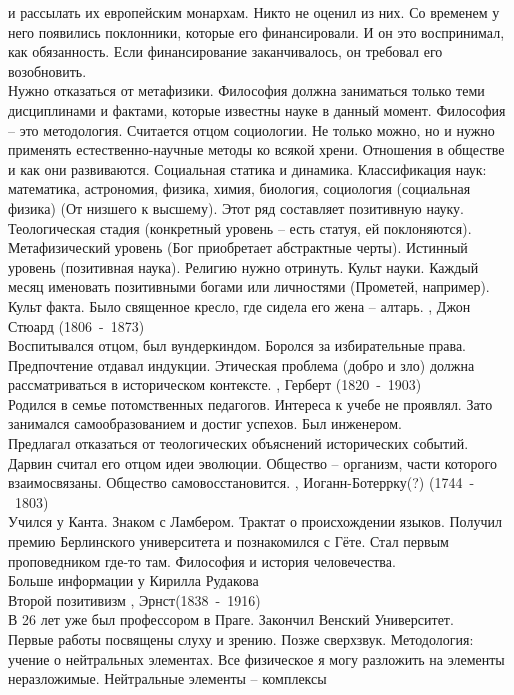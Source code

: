 \documentclass[a4paper,12pt]{report} %
\begin{document}
\begin{itemize}
и рассылать их европейским монархам. Никто не оценил из них. Со
временем у него появились поклонники, которые его финансировали. И он
это воспринимал, как обязанность. Если финансирование заканчивалось,
он требовал его возобновить.\\
Нужно отказаться от метафизики. Философия должна заниматься только
теми дисциплинами и фактами, которые известны науке в данный
момент. Философия -- это методология. Считается отцом социологии. Не
только можно, но и нужно применять естественно-научные методы ко
всякой хрени. Отношения в обществе и как они развиваются. Социальная
статика и динамика. Классификация наук: математика, астрономия,
физика, химия, биология, социология (социальная физика) (От низшего к
высшему). Этот ряд составляет позитивную науку. Теологическая стадия
(конкретный уровень -- есть статуя, ей поклоняются). Метафизический
уровень (Бог приобретает абстрактные черты). Истинный уровень
(позитивная наука). Религию нужно отринуть. Культ науки. Каждый месяц
именовать позитивными богами или личностями (Прометей,
например). Культ факта. Было священное кресло, где сидела его жена
-- алтарь. 
, Джон Стюард (1806~-~1873)\\
Воспитывался отцом, был вундеркиндом. Боролся за избирательные
права. Предпочтение отдавал индукции. Этическая проблема (добро и зло)
должна рассматриваться в историческом контексте.
, Герберт (1820~-~1903)\\
Родился в семье потомственных педагогов. Интереса к учебе не
проявлял. Зато занимался самообразованием и достиг успехов. Был
инженером. \\
Предлагал отказаться от теологических объяснений исторических
событий. Дарвин считал его отцом идеи эволюции. Общество -- организм,
части которого взаимосвязаны. Общество самовосстановится.
, Иоганн-Ботеррку(?) (1744~-~1803)\\
Учился у Канта. Знаком с Ламбером. Трактат о происхождении
языков. Получил премию Берлинского университета и познакомился с
Гёте. Стал первым проповедником где-то там. Философия и история
человечества.
\\Больше информации у Кирилла Рудакова\\
Второй позитивизм
, Эрнст(1838~-~1916)\\
В 26 лет уже был профессором в Праге. Закончил Венский Университет.\\
Первые работы посвящены слуху и зрению. Позже сверхзвук. Методология:
учение о нейтральных элементах. Все физическое я могу разложить на
элементы неразложимые. Нейтральные элементы -- комплексы

\end{itemize}
\end{document}
